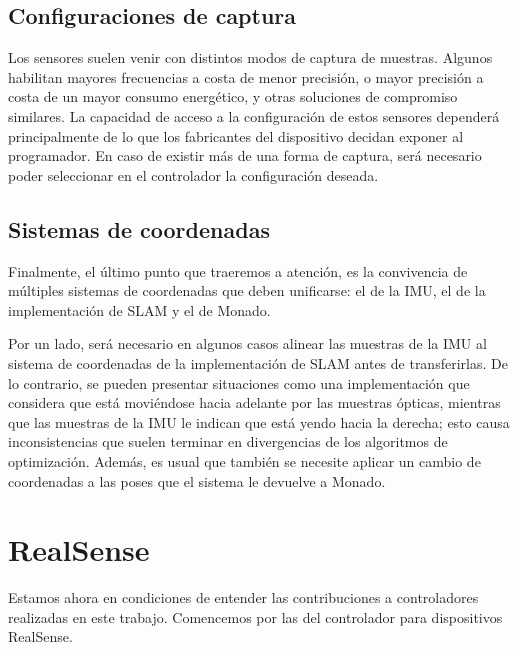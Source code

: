 \documentclass[ twoside,openright,titlepage,numbers=noenddot,%
                headinclude,footinclude,cleardoublepage=empty,abstract=on,
                BCOR=-5mm,paper=a4,fontsize=11pt
                ]{scrreprt}
\begin{document}
\hypertarget{configuraciones-de-captura}{%
\subsection{Configuraciones de
captura}\label{configuraciones-de-captura}}

Los sensores suelen venir con distintos modos de captura de muestras.
Algunos habilitan mayores frecuencias a costa de menor precisión, o
mayor precisión a costa de un mayor consumo energético, y otras
soluciones de compromiso similares. La capacidad de acceso a la
configuración de estos sensores dependerá principalmente de lo que los
fabricantes del dispositivo decidan exponer al programador. En caso de
existir más de una forma de captura, será necesario poder seleccionar en
el controlador la configuración deseada.

\hypertarget{sistemas-de-coordenadas}{%
\subsection{Sistemas de coordenadas}\label{sistemas-de-coordenadas}}

Finalmente, el último punto que traeremos a atención, es la convivencia
de múltiples sistemas de coordenadas que deben unificarse: el de la IMU,
el de la implementación de SLAM y el de Monado.

Por un lado, será necesario en algunos casos alinear las muestras de la
IMU al sistema de coordenadas de la implementación de SLAM antes de
transferirlas. De lo contrario, se pueden presentar situaciones como una
implementación que considera que está moviéndose hacia adelante por las
muestras ópticas, mientras que las muestras de la IMU le indican que
está yendo hacia la derecha; esto causa inconsistencias que suelen
terminar en divergencias de los algoritmos de optimización. Además, es
usual que también se necesite aplicar un cambio de coordenadas a las
poses que el sistema le devuelve a Monado.

\hypertarget{realsense}{%
\section{RealSense}\label{realsense}}

Estamos ahora en condiciones de entender las contribuciones a
controladores realizadas en este trabajo. Comencemos por las del
controlador para dispositivos RealSense.
\end{document}
